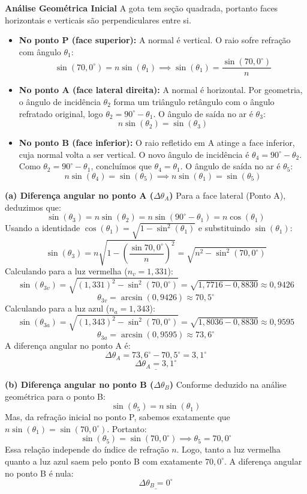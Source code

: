 \documentclass[12pt,a4paper]{article}
\begin{document}
\vspace{0.2cm}
\textbf{Análise Geométrica Inicial}
A gota tem seção quadrada, portanto faces horizontais e verticais são perpendiculares entre si.
\begin{itemize}
    \item \textbf{No ponto P (face superior):} A normal é vertical. O raio sofre refração com ângulo \(\theta_1\):
    \[\sin(70,0^\circ) = n \sin(\theta_1) \implies \sin(\theta_1) = \frac{\sin(70,0^\circ)}{n}\]
    \item \textbf{No ponto A (face lateral direita):} A normal é horizontal. Por geometria, o ângulo de incidência \(\theta_2\) forma um triângulo retângulo com o ângulo refratado original, logo \(\theta_2 = 90^\circ - \theta_1\). O ângulo de saída no ar é \(\theta_3\):
    \[n \sin(\theta_2) = \sin(\theta_3)\]
    \item \textbf{No ponto B (face inferior):} O raio refletido em A atinge a face inferior, cuja normal volta a ser vertical. O novo ângulo de incidência é \(\theta_4 = 90^\circ - \theta_2\). Como \(\theta_2 = 90^\circ - \theta_1\), concluímos que \(\theta_4 = \theta_1\). O ângulo de saída no ar é \(\theta_5\):
    \[n \sin(\theta_4) = \sin(\theta_5) \implies n \sin(\theta_1) = \sin(\theta_5)\]
\end{itemize}

\vspace{0.2cm}
\textbf{(a) Diferença angular no ponto A (\(\Delta\theta_A\))}
Para a face lateral (Ponto A), deduzimos que:
\[\sin(\theta_3) = n \sin(\theta_2) = n \sin(90^\circ - \theta_1) = n \cos(\theta_1)\]
Usando a identidade \(\cos(\theta_1) = \sqrt{1 - \sin^2(\theta_1)}\) e substituindo \(\sin(\theta_1)\):
\[\sin(\theta_3) = n \sqrt{1 - \left(\frac{\sin 70,0^\circ}{n}\right)^2} = \sqrt{n^2 - \sin^2(70,0^\circ)}\]
Calculando para a luz vermelha (\(n_v = 1,331\)):
\[\sin(\theta_{3v}) = \sqrt{(1,331)^2 - \sin^2(70,0^\circ)} = \sqrt{1,7716 - 0,8830} \approx 0,9426\]
\[\theta_{3v} = \arcsin(0,9426) \approx 70,5^\circ\]
Calculando para a luz azul (\(n_a = 1,343\)):
\[\sin(\theta_{3a}) = \sqrt{(1,343)^2 - \sin^2(70,0^\circ)} = \sqrt{1,8036 - 0,8830} \approx 0,9595\]
\[\theta_{3a} = \arcsin(0,9595) \approx 73,6^\circ\]
A diferença angular no ponto A é:
\[\Delta\theta_A = 73,6^\circ - 70,5^\circ = 3,1^\circ\]
\[\underline{\Delta\theta_A = 3,1^\circ}\]

\vspace{0.2cm}
\textbf{(b) Diferença angular no ponto B (\(\Delta\theta_B\))}
Conforme deduzido na análise geométrica para o ponto B:
\[\sin(\theta_5) = n \sin(\theta_1)\]
Mas, da refração inicial no ponto P, sabemos exatamente que \(n \sin(\theta_1) = \sin(70,0^\circ)\). Portanto:
\[\sin(\theta_5) = \sin(70,0^\circ) \implies \theta_5 = 70,0^\circ\]
Essa relação independe do índice de refração \(n\). Logo, tanto a luz vermelha quanto a luz azul saem pelo ponto B com exatamente \(70,0^\circ\).
A diferença angular no ponto B é nula:
\[\underline{\Delta\theta_B = 0^\circ}\]
\end{document}
